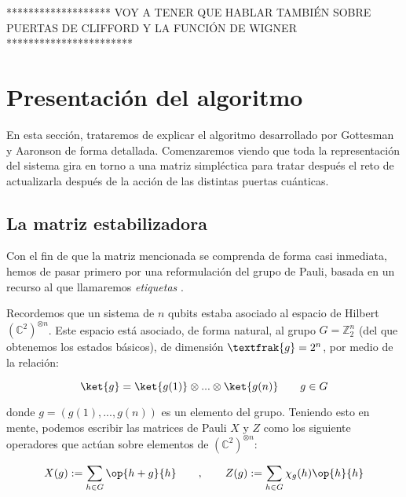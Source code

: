 \documentclass[11pt,a4paper,twoside,pdf]{article}
\numberwithin{equation}{section}
\begin{document}
	\begin{center}
			******************* VOY A TENER QUE HABLAR TAMBIÉN SOBRE PUERTAS DE CLIFFORD Y LA FUNCIÓN DE WIGNER ***********************
	\end{center}	

		
		
\newpage		
\section{Presentación del algoritmo} \label{sec: presentacion algoritmo}

En esta sección, trataremos de explicar el algoritmo desarrollado por Gottesman y Aaronson \cite{Aaronson} de forma detallada. Comenzaremos viendo que toda la representación del sistema gira en torno a una matriz simpléctica para tratar después el reto de actualizarla después de la acción de las distintas puertas cuánticas.

	\subsection{La matriz estabilizadora}
	
	Con el fin de que la matriz mencionada se comprenda de forma casi inmediata, hemos de pasar primero por una reformulación del grupo de Pauli, basada en un recurso al que llamaremos \textit{etiquetas} \cite{Bermejo VanderNest}.
	
	Recordemos que un sistema de $n$ qubits estaba asociado al espacio de Hilbert $\left( \mathbb{C}^2\right) ^{\otimes n}$. Este espacio está asociado, de forma natural, al grupo $G=\mathbb{Z}_2^n$ (del que obtenemos los estados básicos), de dimensión $\textfrak{g}=2^n$, por medio de la relación:
		
		\begin{equation}
			\ket{g} = \ket{g(1)} \otimes ... \otimes \ket{g(n)} \qquad g \in G
		\end{equation}
		
	\noindent donde $g=(g(1),...,g(n))$ es un elemento del grupo. Teniendo esto en mente, podemos escribir las matrices de Pauli $X$ y $Z$ como los siguiente operadores que actúan sobre elementos de $\left( \mathbb{C}^2\right) ^{\otimes n}$:
		
		\begin{equation}\label{eq: Pauli etiquetas}
			X(g) := \displaystyle\sum_{h \in G} \op{h+g}{h}	\qquad , \qquad Z(g) := \displaystyle\sum_{h \in G} \chi_g(h)\op{h}{h}
		\end{equation}
	
\end{document}
